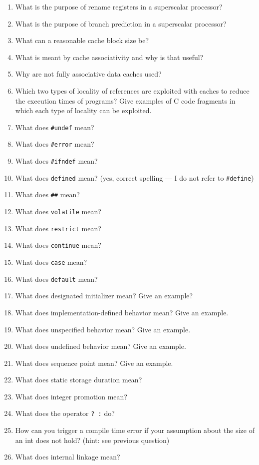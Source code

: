 \documentclass{article}
\begin{document}
\begin{enumerate}
\item What is the purpose of rename registers in a superscalar processor?
\item What is the purpose of branch prediction in a superscalar processor?
\item What can  a reasonable cache block size be?
\item What is meant by cache associativity and why is that useful?
\item Why are not fully associative data caches used?
\item Which two types of locality of references are exploited with
caches to reduce the execution times of programs? Give examples of
C code fragments in which each type of locality can be exploited.

\item What does {\tt \#undef} mean?
\item What does {\tt \#error} mean?
\item What does {\tt \#ifndef} mean?
\item What does {\tt defined} mean? (yes, correct spelling --- I do not refer to {\tt \#define})
\item What does {\tt \#\#} mean?
\item What does {\tt volatile} mean? 
\item What does {\tt restrict} mean? 
\item What does {\tt continue} mean? 
\item What does {\tt case} mean? 
\item What does {\tt default} mean? 
\item What does  designated initializer mean? Give an example?
\item What does  implementation-defined behavior mean? Give an example.
\item What does  unspecified behavior mean? Give an example.
\item What does  undefined behavior mean? Give an example.
\item What does  sequence point mean? Give an example.
\item What does  static storage duration mean?
\item What does  integer promotion mean?
\item What does  the operator \verb!? :! do?
\item How can you trigger a compile time error if your assumption about the size of an int does not hold? (hint: see previous question)
\item What does  internal linkage mean?

\end{enumerate}
\end{document}
